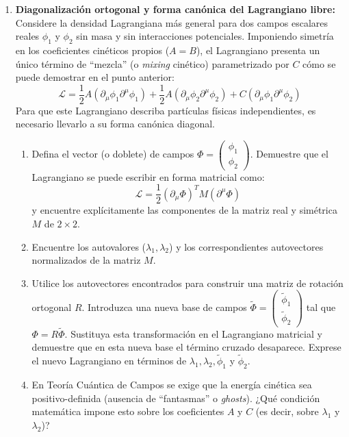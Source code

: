 \begin{enumerate}
  \item \textbf{Diagonalización ortogonal y forma canónica del Lagrangiano libre:}
    \label{item:diag}
    Considere la densidad Lagrangiana más general para dos campos escalares reales $\phi_1$ y $\phi_2$ sin masa y sin interacciones potenciales. Imponiendo simetría en los coeficientes cinéticos propios ($A = B$), el Lagrangiano presenta un único término de ``mezcla'' (o \textit{mixing} cinético) parametrizado por $C$ cómo se puede demostrar en el punto anterior:
    \begin{equation*}
        \mathcal{L} = \frac{1}{2}A(\partial_\mu \phi_1 \partial^\mu \phi_1) + \frac{1}{2}A(\partial_\mu \phi_2 \partial^\mu \phi_2) + C(\partial_\mu \phi_1 \partial^\mu \phi_2)
    \end{equation*}
    Para que este Lagrangiano describa partículas físicas independientes, es necesario llevarlo a su forma canónica diagonal.
    \begin{enumerate}
        \item Defina el vector (o doblete) de campos $\Phi = \begin{pmatrix} \phi_1 \\ \phi_2 \end{pmatrix}$. Demuestre que el Lagrangiano se puede escribir en forma matricial como:
        \begin{equation*}
            \mathcal{L} = \frac{1}{2} (\partial_\mu \Phi)^T M (\partial^\mu \Phi)
        \end{equation*}
        y encuentre explícitamente las componentes de la matriz real y simétrica $M$ de $2 \times 2$.
        \item Encuentre los autovalores ($\lambda_1, \lambda_2$) y los correspondientes autovectores normalizados de la matriz $M$.
        \item Utilice los autovectores encontrados para construir una matriz de rotación ortogonal $R$. Introduzca una nueva base de campos $\tilde{\Phi} = \begin{pmatrix} \tilde{\phi}_1 \\ \tilde{\phi}_2 \end{pmatrix}$ tal que $\Phi = R \tilde{\Phi}$. Sustituya esta transformación en el Lagrangiano matricial y demuestre que en esta nueva base el término cruzado desaparece. Exprese el nuevo Lagrangiano en términos de $\lambda_1, \lambda_2, \tilde{\phi}_1$ y $\tilde{\phi}_2$.
        \item En Teoría Cuántica de Campos se exige que la energía cinética sea positivo-definida (ausencia de ``fantasmas'' o \textit{ghosts}). ¿Qué condición matemática impone esto sobre los coeficientes $A$ y $C$ (es decir, sobre $\lambda_1$ y $\lambda_2$)?

\end{enumerate}
\end{enumerate}
